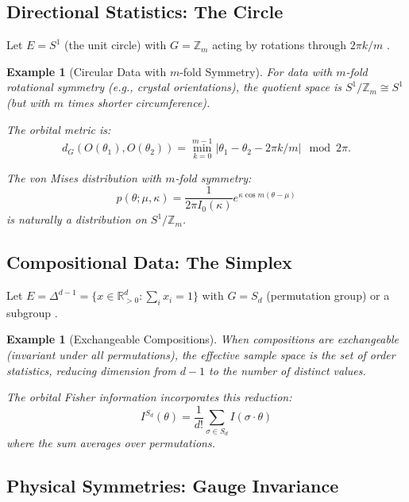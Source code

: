 \documentclass[11pt]{article}
\newtheorem{example}[theorem]{Example}
\newcommand{\R}{\mathbb{R}}
\newcommand{\Z}{\mathbb{Z}}
\begin{document}
\subsection{Directional Statistics: The Circle}

Let $E = S^1$ (the unit circle) with $G = \Z_m$ acting by rotations through $2\pi k/m$ \citep{Mardia2000}.

\begin{example}[Circular Data with $m$-fold Symmetry]\label{ex:circular}
For data with $m$-fold rotational symmetry (e.g., crystal orientations), the quotient space is $S^1/\Z_m \cong S^1$ (but with $m$ times shorter circumference).

The orbital metric is:
\begin{equation}\label{eq:circular_metric}
d_G(O(\theta_1), O(\theta_2)) = \min_{k=0}^{m-1} |\theta_1 - \theta_2 - 2\pi k/m| \mod 2\pi.
\end{equation}

The von Mises distribution with $m$-fold symmetry:
\begin{equation}\label{eq:von_mises}
p(\theta; \mu, \kappa) = \frac{1}{2\pi I_0(\kappa)} e^{\kappa \cos m(\theta - \mu)}
\end{equation}
is naturally a distribution on $S^1/\Z_m$.
\end{example}

\subsection{Compositional Data: The Simplex}

Let $E = \Delta^{d-1} = \{x \in \R_{>0}^d : \sum_i x_i = 1\}$ with $G = S_d$ (permutation group) or a subgroup \citep{Aitchison1986}.

\begin{example}[Exchangeable Compositions]\label{ex:simplex}
When compositions are exchangeable (invariant under all permutations), the effective sample space is the set of order statistics, reducing dimension from $d-1$ to the number of distinct values.

The orbital Fisher information incorporates this reduction:
\begin{equation}\label{eq:orbital_fisher_simplex}
I^{S_d}(\theta) = \frac{1}{d!} \sum_{\sigma \in S_d} I(\sigma \cdot \theta)
\end{equation}
where the sum averages over permutations.
\end{example}

\subsection{Physical Symmetries: Gauge Invariance}
\end{document}
